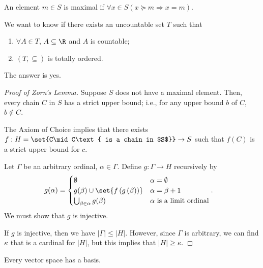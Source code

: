 \documentclass[10pt]{mypackage}
\begin{document}
\begin{definition}
  An element $m\in S$ is maximal if $\forall x\in S \left(x\succeq m \Rightarrow x = m\right)$.
\end{definition}
\begin{example}
  We want to know if there exists an uncountable set $T$ such that
  \begin{enumerate}[(1)]
    \item $\forall A\in T$, $A\subseteq \R$ and $A$ is countable;
    \item $ \left(T,\subseteq\right) $ is totally ordered.
  \end{enumerate}
  The answer is yes.
\end{example}
\begin{proof}[Proof of Zorn's Lemma]
  Suppose $S$ does not have a maximal element. Then, every chain $C$ in $S$ has a strict upper bound; i.e., for any upper bound $b$ of $C$, $b\notin C$.\newline

  The Axiom of Choice implies that there exists $f: H = \set{C\mid C\text{ is a chain in $S$}}\rightarrow S$ such that $f(C)$ is a strict upper bound for $c$.\newline

  Let $\Gamma$ be an arbitrary ordinal, $\alpha \in \Gamma$. Define $g: \Gamma \rightarrow H$ recursively by
  \begin{align*}
    g(\alpha) &= \begin{cases}
      \emptyset & \alpha = \emptyset\\
      g(\beta) \cup \set{f\left(g\left(\beta\right)\right)}& \alpha = \beta + 1\\
      \bigcup_{\beta\in\alpha}g(\beta)& \alpha\text{ is a limit ordinal}
    \end{cases}.
  \end{align*}
  We must show that $g$ is injective.\newline

  If $g$ is injective, then we have $\left\vert \Gamma \right\vert\leq \left\vert H \right\vert$. However, since $\Gamma$ is arbitrary, we can find $\kappa$ that is a cardinal for $\left\vert H \right\vert$, but this implies that $\left\vert H \right\vert \geq \kappa$.
\end{proof}
  \begin{theorem}
    Every vector space has a basis.
  \end{theorem}
\end{document}
